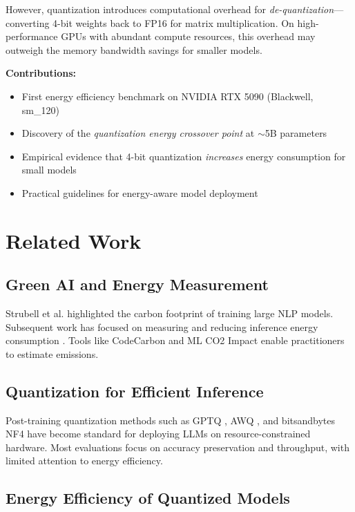 \documentclass[11pt]{article}
\begin{document}
However, quantization introduces computational overhead for \textit{de-quantization}---converting 4-bit weights back to FP16 for matrix multiplication. On high-performance GPUs with abundant compute resources, this overhead may outweigh the memory bandwidth savings for smaller models.

\textbf{Contributions:}
\begin{itemize}
    \item First energy efficiency benchmark on NVIDIA RTX 5090 (Blackwell, sm\_120)
    \item Discovery of the \textit{quantization energy crossover point} at $\sim$5B parameters
    \item Empirical evidence that 4-bit quantization \textit{increases} energy consumption for small models
    \item Practical guidelines for energy-aware model deployment
\end{itemize}

\section{Related Work}

\subsection{Green AI and Energy Measurement}

Strubell et al. \cite{strubell2019energy} highlighted the carbon footprint of training large NLP models. Subsequent work has focused on measuring and reducing inference energy consumption \cite{henderson2020towards, luccioni2022estimating}. Tools like CodeCarbon \cite{codecarbon} and ML CO2 Impact \cite{mlco2} enable practitioners to estimate emissions.

\subsection{Quantization for Efficient Inference}

Post-training quantization methods such as GPTQ \cite{frantar2022gptq}, AWQ \cite{lin2023awq}, and bitsandbytes NF4 \cite{dettmers2023qlora} have become standard for deploying LLMs on resource-constrained hardware. Most evaluations focus on accuracy preservation and throughput, with limited attention to energy efficiency.

\subsection{Energy Efficiency of Quantized Models}
\end{document}
